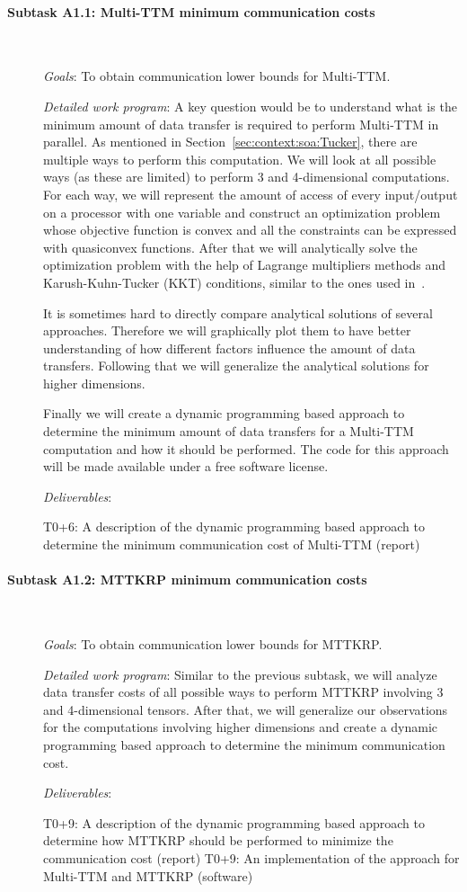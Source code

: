 \documentclass[a4paper,11pt]{article}
\newcommand{\subtask}[1]{{\color{orange}\paragraph{#1}$ $}}
\newcommand{\goal}{{\color{orange2}  \emph{Goals}:} }
\newcommand{\dwp}{{\color{orange2}  \emph{Detailed work program}: }}
\newcommand{\deliverables}{{\color{orange2}  \emph{Deliverables}: }}
\begin{document}
	\newpage
	\subtask{Subtask A1.1: Multi-TTM minimum communication costs}
	\begin{description}
		\item[] \goal To obtain communication lower bounds for Multi-TTM.
		\item[] \dwp A key question would be to understand what is the minimum amount of data transfer is required to perform Multi-TTM in parallel. As mentioned in Section~\ref{sec:context:soa:Tucker}, there are multiple ways to perform this computation. We will look at all possible ways (as these are limited) to perform 3 and 4-dimensional computations. For each way, we will represent the amount of access of every input/output on a processor with one variable and construct an optimization problem whose objective function is convex and all the constraints can be expressed with quasiconvex functions. After that we will analytically solve the optimization problem with the help of Lagrange multipliers methods and Karush-Kuhn-Tucker (KKT) conditions, similar to the ones used in~\cite{ABGKR-SPAA-2022,ABGKR-SIMAX-2024}.
		
		
		It is sometimes hard to directly compare analytical solutions of several approaches. Therefore we will graphically plot them to have better understanding of how different factors influence the amount of data transfers. Following that we will generalize the analytical solutions for higher dimensions. 
		
		Finally we will create a dynamic programming based approach to determine the minimum amount of data transfers for a Multi-TTM computation and how it should be performed. The code for this approach will be made available under a free software license.
		
		\item[] \deliverables
		
		T0+6: A description of the dynamic programming based approach to determine the minimum communication cost of Multi-TTM (report)
	\end{description}
	
	\subtask{Subtask A1.2: MTTKRP minimum communication costs}
	\begin{description}
		\item[] \goal To obtain communication lower bounds for MTTKRP.
		\item[] \dwp Similar to the previous subtask, we will analyze data transfer costs of all possible ways to perform MTTKRP involving 3 and 4-dimensional tensors. After that, we will generalize our observations for the computations involving higher dimensions and create a dynamic programming based approach to determine the minimum communication cost.
		\item[] \deliverables
		
		T0+9: A description of the dynamic programming based approach to determine how MTTKRP should be performed to minimize the communication cost (report)\newline
		T0+9: An implementation of the approach for Multi-TTM and MTTKRP (software)
	\end{description}
	
\end{document}
